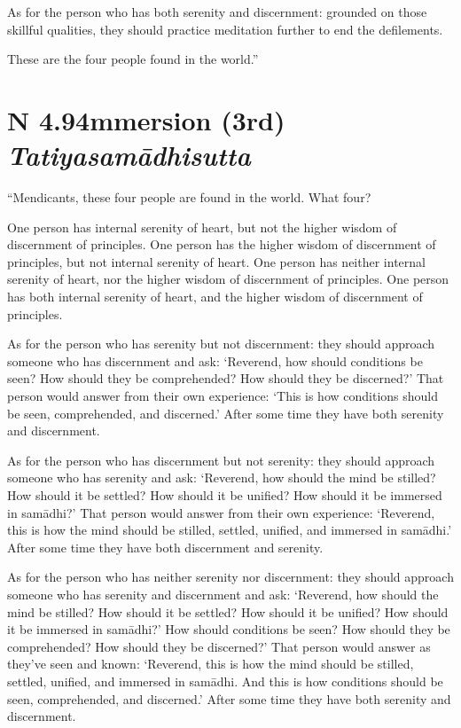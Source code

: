\documentclass[12pt,openany]{book}%
\newcommand*{\suttatitleacronym}[1]{\smaller[2]{#1}\vspace*{.3em}}
\newcommand*{\suttatitletranslation}[1]{\linebreak{#1}}
\newcommand*{\suttatitleroot}[1]{\linebreak\smaller[2]\itshape{#1}}
\newcommand*{\tocacronym}[1]{\hspace*{-3.3em}{#1}\quad}
\newcommand*{\toctranslation}[1]{#1}
\newcommand*{\tocroot}[1]{(\textit{#1})}
\begin{document}
As for the person who has both serenity and discernment: grounded on those skillful qualities, they should practice meditation further to end the defilements. 

These are the four people found in the world.” 

%
\section*{{\suttatitleacronym AN 4.94}{\suttatitletranslation Immersion (3rd) }{\suttatitleroot Tatiyasamādhisutta}}
\addcontentsline{toc}{section}{\tocacronym{AN 4.94} \toctranslation{Immersion (3rd) } \tocroot{Tatiyasamādhisutta}}

“Mendicants, these four people are found in the world. What four? 

One person has internal serenity of heart, but not the higher wisdom of discernment of principles. One person has the higher wisdom of discernment of principles, but not internal serenity of heart. One person has neither internal serenity of heart, nor the higher wisdom of discernment of principles. One person has both internal serenity of heart, and the higher wisdom of discernment of principles. 

As for the person who has serenity but not discernment: they should approach someone who has discernment and ask: ‘Reverend, how should conditions be seen? How should they be comprehended? How should they be discerned?’ That person would answer from their own experience: ‘This is how conditions should be seen, comprehended, and discerned.’ After some time they have both serenity and discernment. 

As for the person who has discernment but not serenity: they should approach someone who has serenity and ask: ‘Reverend, how should the mind be stilled? How should it be settled? How should it be unified? How should it be immersed in \textsanskrit{samādhi}?’ That person would answer from their own experience: ‘Reverend, this is how the mind should be stilled, settled, unified, and immersed in \textsanskrit{samādhi}.’ After some time they have both discernment and serenity. 

As for the person who has neither serenity nor discernment: they should approach someone who has serenity and discernment and ask: ‘Reverend, how should the mind be stilled? How should it be settled? How should it be unified? How should it be immersed in \textsanskrit{samādhi}?’ How should conditions be seen? How should they be comprehended? How should they be discerned?’ That person would answer as they’ve seen and known: ‘Reverend, this is how the mind should be stilled, settled, unified, and immersed in \textsanskrit{samādhi}. And this is how conditions should be seen, comprehended, and discerned.’ After some time they have both serenity and discernment. 
\end{document}
